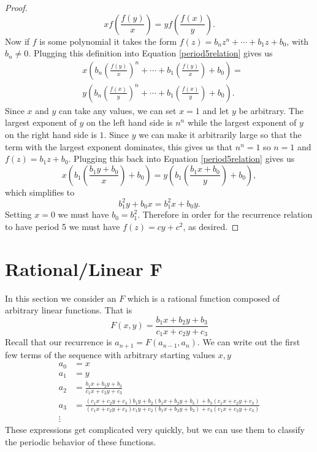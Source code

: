 \documentclass[12pt]{article}
\begin{document}
\begin{proof}
\begin{equation}
\label{period5relation}
xf\left(\frac{f(y)}{x}\right) = y f\left(\frac{f(x)}{y}\right).
\end{equation}
Now if $f$ is some polynomial it takes the form $f(z) = b_n z^n + \cdots + b_1 z + b_0$, with $b_n \neq 0$. Plugging this definition into Equation \ref{period5relation} gives us 
\begin{align*}
&x\left( b_n \left( \frac{f(y)}{x}\right)^n + \cdots + b_1 \left( \frac{f(y)}{x}\right) + b_0 \right) = \\
& y\left( b_n \left( \frac{f(x)}{y}\right)^n + \cdots + b_1 \left( \frac{f(x)}{y}\right) + b_0 \right). 
\end{align*}
Since $x$ and $y$ can take any values, we can set $x=1$ and let $y$ be arbitrary. The largest exponent of $y$ on the left hand side is $n^n$ while the largest exponent of $y$ on the right hand side is $1$. Since $y$ we can make it arbitrarily large so that the term with the largest exponent dominates, this gives us that $n^n=1$ so $n=1$ and $f(z) =b_1 z + b_0$. Plugging this back into Equation \ref{period5relation} gives us 
\begin{equation*}
x\left(b_1 \left( \frac{b_1 y + b_0}{x} \right) + b_0 \right) = y\left(b_1 \left( \frac{b_1 x + b_0}{y} \right) + b_0 \right),
\end{equation*}
which simplifies to 
\begin{equation*}
b_1^2 y + b_0 x = b_1^2 x + b_0 y.
\end{equation*}
Setting $x=0$ we must have $b_0=b_1^2$. Therefore in order for the recurrence relation to have period 5 we must have $f(z)=cy+c^2$, as desired. 
\end{proof}



\section{Rational/Linear F}
In this section we consider an $F$ which is a rational function composed of arbitrary linear functions. That is 
\begin{equation}
\label{rationallinear}
F(x,y) = \frac{ b_1 x + b_2 y + b_3}{ c_1 x+ c_2 y + c_3}
\end{equation}
Recall that our recurrence is $a_{n+1} = F( a_{n-1}, a_n)$. We can write out the first few terms of the sequence with arbitrary starting values $x,y$
\begin{align}
a_0 &= x \\ 
a_1 &=y \\
a_2 &= \frac{ b_1 x + b_2 y + b_3}{ c_1 x+ c_2 y + c_3}\\
\label{athree}a_3 &= \frac{(c_1 x+ c_2 y + c_3) b_1 y + b_2 (b_1 x + b_2 y + b_3)+ b_3(c_1 x+ c_2 y + c_3)}{ (c_1 x+ c_2 y + c_3)c_1 y+ c_2 (b_1 x + b_2 y + b_3) + c_3(c_1 x+ c_2 y + c_3)} \\
\vdots
\end{align}
These expressions get complicated very quickly, but we can use them to classify the periodic behavior of these functions.
\end{document}
